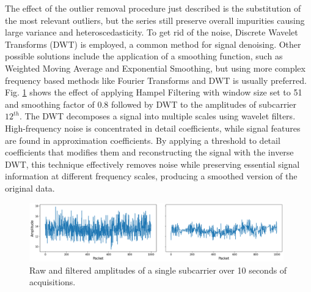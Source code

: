 \documentclass[binding=0.7cm, oneside]{sapthesis}
\begin{document}
The effect of the outlier removal procedure just described is the substitution of the most relevant outliers, but the series still preserve overall impurities causing large variance and heteroscedasticity.
To get rid of the noise, Discrete Wavelet Transforms (DWT) is employed, a common method for signal denoising. Other possible solutions include the application of a smoothing function, such as Weighted Moving Average and Exponential Smoothing,
but using more complex frequency based methods like Fourier Transforms and DWT is usually preferred. Fig. \ref{fig:Hampel1} shows the effect of applying Hampel Filtering with window size set to 51 and smoothing factor of 0.8 followed by DWT
to the amplitudes of subcarrier $12^{th}$. The DWT decomposes a signal into multiple scales using wavelet filters. High-frequency noise is concentrated in detail coefficients, while signal features are found in approximation coefficients.
By applying a threshold to detail coefficients that modifies them and reconstructing the signal with the inverse DWT, this technique effectively removes noise while preserving essential signal information \cite{DWT_review} at different frequency scales,
producing a smoothed version of the original data.

\begin{figure}[h]
    \centering
    \includegraphics[width=0.98\textwidth]{images/hampel_DWT.png}
    \caption{Raw and filtered amplitudes of a single subcarrier over 10 seconds of acquisitions.}
    \label{fig:Hampel1}
\end{figure}
\end{document}
